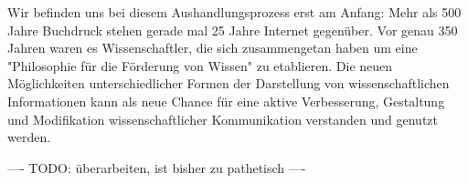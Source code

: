Wir befinden uns bei diesem Aushandlungsprozess erst am Anfang: Mehr als 500 Jahre Buchdruck stehen gerade mal 25 Jahre Internet gegenüber. Vor genau 350 Jahren waren es Wissenschaftler, die sich zusammengetan haben um eine "Philosophie für die Förderung von Wissen" zu etablieren. Die neuen Möglichkeiten unterschiedlicher Formen der Darstellung von wissenschaftlichen Informationen kann als neue Chance für eine aktive Verbesserung, Gestaltung und Modifikation wissenschaftlicher Kommunikation verstanden und genutzt werden.

---- TODO: überarbeiten, ist bisher zu pathetisch ----
